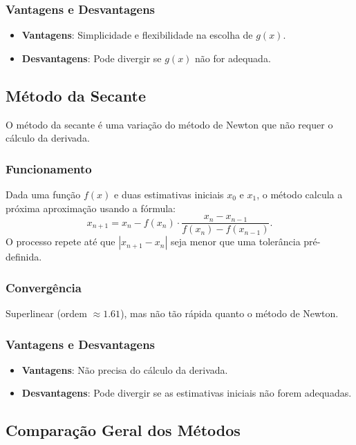 \subsubsection{Vantagens e Desvantagens}

\begin{itemize}
	\item \textbf{Vantagens}: Simplicidade e flexibilidade na escolha de \( g(x) \).
	\item \textbf{Desvantagens}: Pode divergir se \( g(x) \) não for adequada.
\end{itemize}

\subsection{\textbf{Método da Secante}}

O método da secante é uma variação do método de Newton que não requer o cálculo
da derivada.\cite{dequadros2009fundamentos}

\subsubsection{Funcionamento}

Dada uma função \( f(x) \) e duas estimativas iniciais \( x_0 \) e \( x_1 \), o
método calcula a próxima aproximação usando a fórmula:
\[
	x_{n+1} = x_n - f(x_n) \cdot \frac{x_n - x_{n-1}}{f(x_n) - f(x_{n-1})}.
\]
O processo repete até que \( |x_{n+1} - x_n| \) seja menor que uma tolerância
pré-definida.

\subsubsection{Convergência}

Superlinear (ordem \( \approx 1.61\)), mas não tão rápida quanto o método de
Newton.

\subsubsection{Vantagens e Desvantagens}

\begin{itemize}
	\item \textbf{Vantagens}: Não precisa do cálculo da derivada.
	\item \textbf{Desvantagens}: Pode divergir se as estimativas iniciais não forem adequadas.
\end{itemize}

\subsection{\textbf{Comparação Geral dos Métodos}}

